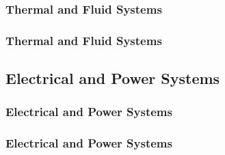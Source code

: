 \documentclass[fleqn]{beamer} %
\newcommand{\sectionIIIsubsectionIIItitle}{Thermal and Fluid Systems}
\newcommand{\sectionIIIsubsectionIVtitle}{Electrical and Power Systems}
\newcommand{\btVFill}{\vskip0pt plus 1filll}
\begin{document}
			\begin{frame}
				\frametitle{\sectionIIIsubsectionIIItitle}
		

			\end{frame}

			\begin{frame}
				\frametitle{\sectionIIIsubsectionIIItitle}
		

			\end{frame}

		\subsection{\sectionIIIsubsectionIVtitle}\label{sectionIIIsubsectionIV}	

			\begin{frame}
				\frametitle{\sectionIIIsubsectionIVtitle}
		

			\end{frame}

			\begin{frame}
				\frametitle{\sectionIIIsubsectionIVtitle}
		

			\end{frame}
\end{document}
